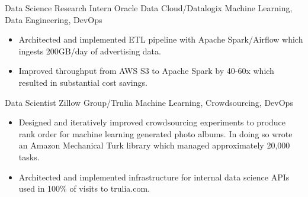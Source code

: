 \documentclass[11pt,a4paper,sans]{moderncv} %
\begin{document}
		{Data Science Research Intern}
		{Oracle Data Cloud/Datalogix}
		{Machine Learning, Data Engineering, DevOps}
		{}
		{
			\begin{itemize}
			\item Architected and implemented ETL pipeline with Apache Spark/Airflow which ingests 200GB/day of advertising data.
			\item Improved throughput from AWS S3 to Apache Spark by 40-60x which resulted in substantial cost savings.
			\end{itemize}
		}

		{Data Scientist}
		{Zillow Group/Trulia}
		{Machine Learning, Crowdsourcing, DevOps}
		{}
		{
			\begin{itemize}
				\item Designed and iteratively improved crowdsourcing experiments to produce rank order for machine learning generated photo albums. In doing so wrote an Amazon Mechanical Turk library which managed approximately 20,000 tasks.
				\item Architected and implemented infrastructure for internal data science APIs used in 100\% of visits to trulia.com.
			\end{itemize}
		}
\end{document}
